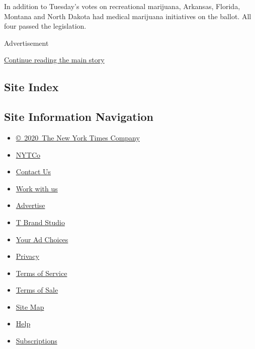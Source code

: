 In addition to Tuesday's votes on recreational marijuana, Arkansas,
Florida, Montana and North Dakota had medical marijuana initiatives on
the ballot. All four passed the legislation.

Advertisement

\protect\hyperlink{after-bottom}{Continue reading the main story}

\hypertarget{site-index}{%
\subsection{Site Index}\label{site-index}}

\hypertarget{site-information-navigation}{%
\subsection{Site Information
Navigation}\label{site-information-navigation}}

\begin{itemize}
\tightlist
\item
  \href{https://help.nytimes3xbfgragh.onion/hc/en-us/articles/115014792127-Copyright-notice}{©~2020~The
  New York Times Company}
\end{itemize}

\begin{itemize}
\tightlist
\item
  \href{https://www.nytco.com/}{NYTCo}
\item
  \href{https://help.nytimes3xbfgragh.onion/hc/en-us/articles/115015385887-Contact-Us}{Contact
  Us}
\item
  \href{https://www.nytco.com/careers/}{Work with us}
\item
  \href{https://nytmediakit.com/}{Advertise}
\item
  \href{http://www.tbrandstudio.com/}{T Brand Studio}
\item
  \href{https://www.nytimes3xbfgragh.onion/privacy/cookie-policy\#how-do-i-manage-trackers}{Your
  Ad Choices}
\item
  \href{https://www.nytimes3xbfgragh.onion/privacy}{Privacy}
\item
  \href{https://help.nytimes3xbfgragh.onion/hc/en-us/articles/115014893428-Terms-of-service}{Terms
  of Service}
\item
  \href{https://help.nytimes3xbfgragh.onion/hc/en-us/articles/115014893968-Terms-of-sale}{Terms
  of Sale}
\item
  \href{https://spiderbites.nytimes3xbfgragh.onion}{Site Map}
\item
  \href{https://help.nytimes3xbfgragh.onion/hc/en-us}{Help}
\item
  \href{https://www.nytimes3xbfgragh.onion/subscription?campaignId=37WXW}{Subscriptions}
\end{itemize}

